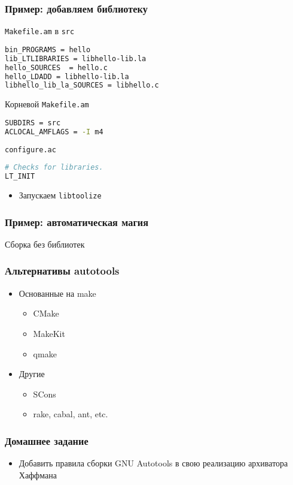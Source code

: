 \begin{frame}
	\frametitle{Пример: добавляем библиотеку}
	\begin{block}{\texttt{Makefile.am} в {\tt src}}
\begin{lstlisting}[language=sh]
bin_PROGRAMS = hello
lib_LTLIBRARIES = libhello-lib.la
hello_SOURCES  = hello.c
hello_LDADD = libhello-lib.la
libhello_lib_la_SOURCES = libhello.c
\end{lstlisting}
	\end{block}

	\begin{block}{Корневой \texttt{Makefile.am}}
\begin{lstlisting}[language=sh]
SUBDIRS = src
ACLOCAL_AMFLAGS = -I m4
\end{lstlisting}
	\end{block}

	\begin{block}{\texttt{configure.ac}}
\begin{lstlisting}[language=sh]
# Checks for libraries.
LT_INIT
\end{lstlisting}
	\end{block}

	\begin{itemize}
		\item Запускаем {\tt libtoolize} 
	\end{itemize}

\end{frame}

\begin{frame}[fragile]
	\frametitle{Пример: автоматическая магия}
	\begin{block}{Сборка без библиотек}
	\end{block}
\end{frame}


\begin{frame}
 \frametitle{Альтернативы autotools}
\begin{itemize}
  \item{Основанные на make}
  \begin{itemize}
    \item CMake
    \item MakeKit
    \item qmake
  \end{itemize}
  \item{Другие}
    \begin{itemize}
      \item SCons
      \item rake, cabal, ant, etc.
    \end{itemize}
\end{itemize}
\end{frame}

\begin{frame}
 \frametitle{Домашнее задание}
  \begin{itemize}
    \item Добавить правила сборки GNU Autotools в свою реализацию архиватора Хаффмана
  \end{itemize}
\end{frame} 